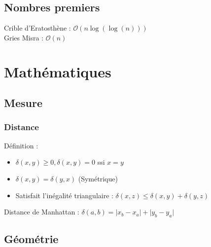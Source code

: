 \documentclass[8pt]{article}
\begin{document}
        \subsection{Nombres premiers}
        Crible d'Eratosthène : $\mathcal{O}(n \log(\log(n)))$ \\
        Gries Misra : $\mathcal{O}(n)$
        {\scriptsize}
    \section{Mathématiques}
        \subsection{Mesure}
            \subsubsection{Distance}
            Définition : 
            \begin{itemize}
                \item $\delta(x,y) \geq 0, \delta(x,y) = 0$ ssi $x=y$
                \item $\delta(x,y) = \delta(y,x)$ (Symétrique)
                \item Satisfait l'inégalité triangulaire : $\delta(x,z) \leq \delta(x,y) + \delta(y,z)$
            \end{itemize}
            Distance de Manhattan :
            $\delta(a,b) = \lvert x_b-x_a \rvert + \lvert y_b-y_a \rvert$
        \subsection{Géométrie}
\end{document}
